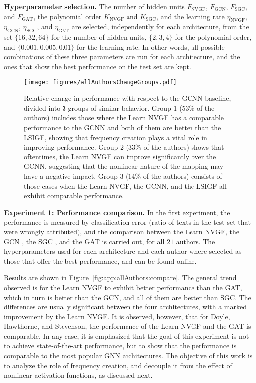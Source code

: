 \textbf{Hyperparameter selection.} The number of hidden units $F_{\text{NVGF}}$, $F_{\text{GCN}}$, $F_{\text{SGC}}$, and $F_{\text{GAT}}$, the polynomial order $K_{\text{NVGF}}$ and $K_{\text{SGC}}$, and the learning rate $\eta_{\text{NVGF}}$, $\eta_{\text{GCN}}$, $\eta_{\text{SGC}}$, and $\eta_{\text{GAT}}$ are selected, independently for each architecture, from the set $\{16,32,64\}$ for the number of hidden units, $\{2, 3, 4\}$ for the polynomial order, and $\{0.001, 0.005, 0.01\}$ for the learning rate. In other words, all possible combinations of these three parameters are run for each architecture, and the ones that show the best performance on the test set are kept.

\begin{figure*}
    \centering
    \texttt{[image: figures/allAuthorsChangeGroups.pdf]}
    \caption{Relative change in performance with respect to the GCNN baseline, divided into $3$ groups of similar behavior. Group 1 ($53\%$ of the authors) includes those where the Learn NVGF has a comparable performance to the GCNN and both of them are better than the LSIGF, showing that frequency creation plays a vital role in improving performance. Group 2 ($33\%$ of the authors) shows that oftentimes, the Learn NVGF can improve significantly over the GCNN, suggesting that the nonlinear nature of the mapping may have a negative impact. Group 3 ($14\%$ of the authors) consists of those cases when the Learn NVGF, the GCNN, and the LSIGF all exhibit comparable performance.}
    \label{fig:app:allAuthors:change}
\end{figure*}

\textbf{Experiment 1: Performance comparison.} In the first experiment, the performance is measured by classification error (ratio of texts in the test set that were wrongly attributed), and the comparison between the Learn NVGF, the GCN \cite{Kipf2017-GCN}, the SGC \cite{Weinberger2019-SGC}, and the GAT \cite{Velickovic2018-GAT} is carried out, for all $21$ authors. The hyperparameters used for each architecture and each author where selected as those that offer the best performance, and can be found online.

Results are shown in Figure~\ref{fig:app:allAuthors:compare}. The general trend observed is for the Learn NVGF to exhibit better performance than the GAT, which in turn is better than the GCN, and all of them are better than SGC. The differences are usually significant between the four architectures, with a marked improvement by the Learn NVGF. It is observed, however, that for Doyle, Hawthorne, and Stevenson, the performance of the Learn NVGF and the GAT is comparable. In any case, it is emphasized that the goal of this experiment is not to achieve state-of-the-art performance, but to show that the performance is comparable to the most popular GNN architectures. The objective of this work is to analyze the role of frequency creation, and decouple it from the effect of nonlinear activation functions, as discussed next.

